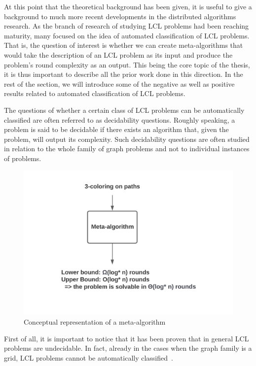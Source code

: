 At this point that the theoretical background has been given, it is
useful to give a background to much more recent developments in the
distributed algorithms research. As the branch of research of
studying LCL problems had been reaching maturity, many focused
on the idea of automated classification of LCL problems. That is,
the question of interest is whether we can create meta-algorithms
that would take the description of an LCL problem as its input
and produce the problem's round complexity as an output.
This being the core topic of the thesis, it is thus important
to describe all the prior work done in this direction.
In the rest of the
section, we will introduce some of the negative as well as positive results
related to automated classification of LCL problems.

The questions of whether a certain class of LCL problems
can be automatically classified are often referred to
as decidability questions. Roughly speaking, a problem is
said to be decidable if there exists an algorithm that,
given the problem, will output its complexity. Such decidability
questions are often studied in relation to the whole
family of graph problems and not to individual instances
of problems.

\begin{figure}[ht]
  \begin{center}
    \includegraphics[width=\textwidth]{images/meta-algorithm.png}
    \caption{Conceptual representation of a meta-algorithm}
    \label{fig:meta-algorithm}
  \end{center}
\end{figure}

First of all, it is important to notice that it has been
proven that in general LCL problems are undecidable.
In fact, already in the cases when the graph family is a grid,
LCL problems cannot be automatically classified~\cite{Brandt2017, Naor1993}.

